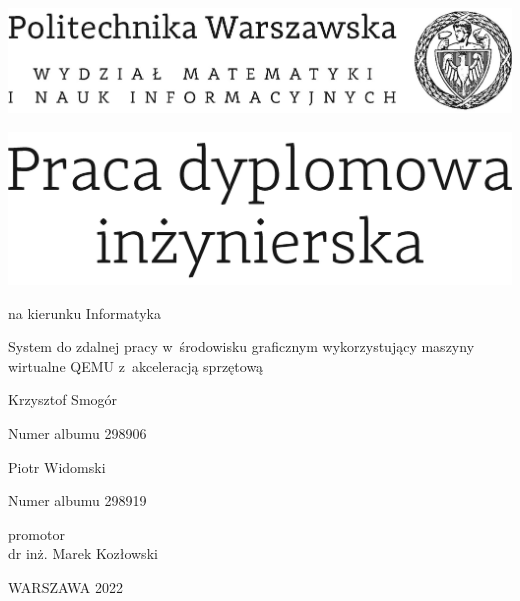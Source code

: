 \documentclass[12pt,twoside,a4paper]{article}
\newcommand{\discipline}{Informatyka}
\renewcommand{\title}{System do zdalnej pracy w~środowisku graficznym wykorzystujący maszyny wirtualne QEMU z~akceleracją sprzętową}
\newcommand{\supervisor}{dr inż. Marek Kozłowski}
\renewcommand{\year}{2022}
\newcommand{\authori}{Krzysztof Smogór}
\newcommand{\albumi}{298906}
\newcommand{\authorii}{Piotr Widomski}
\newcommand{\albumii}{298919}
\begin{document}
\pagestyle{empty}

\begin{center}

\includegraphics[scale=1.]{img/politechnika}
\vspace{40pt}

\includegraphics[scale=1.]{img/praca_inz}  %

{ \arial na kierunku \discipline

\vspace{30pt}
{\arial \large \title}

\vspace{40pt}

{\arial \huge \authori }

\vspace{5pt}

Numer albumu \albumi

\vspace {20pt}
{\arial \huge \authorii}

\vspace{5pt}

Numer albumu \albumii

\vspace{40pt}

promotor \\
{\arial \supervisor}

\vspace{15pt}


 \vfill
WARSZAWA \year \\
}
\end{center}


%
%
\end{document}
